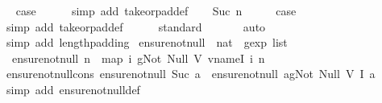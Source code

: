 \begin{isabellebody}
\ \isamarkupfalse%
\ {\isacharquery}case\isanewline
\ \ \ \ \isamarkupfalse%
\ {\isacharparenleft}simp\ add{\isacharcolon}\ take{\isacharunderscore}or{\isacharunderscore}pad{\isacharunderscore}def{\isacharparenright}\isanewline
{}\isamarkupfalse%
\isanewline
\ \ \isamarkupfalse%
\ {\isacharparenleft}Suc\ n{\isacharparenright}\isanewline
\ \ \isamarkupfalse%
\ \isamarkupfalse%
\ {\isacharquery}case\isanewline
\ \ \ \ \isamarkupfalse%
\ {\isacharparenleft}simp\ add{\isacharcolon}\ take{\isacharunderscore}or{\isacharunderscore}pad{\isacharunderscore}def{\isacharparenright}\isanewline
\ \ \ \ \isamarkupfalse%
\ standard\isanewline
\ \ \ \ \ \isamarkupfalse%
\ auto{\isacharbrackleft}{}{\isacharbrackright}\isanewline
\ \ \ \ \isamarkupfalse%
\ {\isacharparenleft}simp\ add{\isacharcolon}\ length{\isacharunderscore}padding{\isacharparenright}\isanewline
{}\isamarkupfalse%
%
\endisatagproof
{\isafoldproof}%
%
\isadelimproof
\isanewline
%
\endisadelimproof
\isanewline
{}\isamarkupfalse%
\ ensure{\isacharunderscore}not{\isacharunderscore}null\ {\isacharcolon}{\isacharcolon}\ {\isachardoublequoteopen}nat\ {\isasymRightarrow}\ gexp\ list{\isachardoublequoteclose}\ \isanewline
\ \ {\isachardoublequoteopen}ensure{\isacharunderscore}not{\isacharunderscore}null\ n\ {\isacharequal}\ map\ {\isacharparenleft}{\isasymlambda}i{\isachardot}\ gNot\ {\isacharparenleft}Null\ {\isacharparenleft}V\ {\isacharparenleft}vname{\isachardot}I\ i{\isacharparenright}{\isacharparenright}{\isacharparenright}{\isacharparenright}\ {\isacharbrackleft}{}{\isachardot}{\isachardot}{\isacharless}n{\isacharbrackright}{\isachardoublequoteclose}\isanewline
\isanewline
{}\isamarkupfalse%
\ ensure{\isacharunderscore}not{\isacharunderscore}null{\isacharunderscore}cons{\isacharcolon}\ {\isachardoublequoteopen}ensure{\isacharunderscore}not{\isacharunderscore}null\ {\isacharparenleft}Suc\ a{\isacharparenright}\ {\isacharequal}\ {\isacharparenleft}ensure{\isacharunderscore}not{\isacharunderscore}null\ a{\isacharparenright}{\isacharat}{\isacharbrackleft}gNot\ {\isacharparenleft}Null\ {\isacharparenleft}V\ {\isacharparenleft}I\ a{\isacharparenright}{\isacharparenright}{\isacharparenright}{\isacharbrackright}{\isachardoublequoteclose}\isanewline
%
\isadelimproof
\ \ %
\endisadelimproof
%
\isatagproof
{}\isamarkupfalse%
\ {\isacharparenleft}simp\ add{\isacharcolon}\ ensure{\isacharunderscore}not{\isacharunderscore}null{\isacharunderscore}def{\isacharparenright}%

\end{isabellebody}
